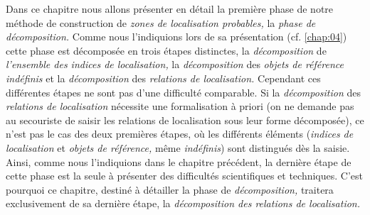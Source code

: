 Dans ce chapitre nous allons présenter en détail la première phase de
notre méthode de construction de \emph{zones de localisation
  probables,} la \emph{phase de décomposition.} Comme nous
l'indiquions lors de sa présentation (cf. \autoref{chap:04}) cette
phase est décomposée en trois étapes distinctes, la
\emph{décomposition} de \emph{l'ensemble des indices de localisation,}
la \emph{décomposition} des \emph{objets de référence indéfinis} et la
\emph{décomposition} des \emph{relations de localisation.} Cependant
ces différentes étapes ne sont pas d'une difficulté comparable. Si la
\emph{décomposition} des \emph{relations de localisation} nécessite
une formalisation à priori (on ne demande pas au secouriste de saisir
les relations de localisation sous leur forme décomposée), ce n'est
pas le cas des deux premières étapes, où les différents éléments
(\emph{indices de localisation} et \emph{objets de référence,} même
\emph{indéfinis}) sont distingués dès la saisie. Ainsi, comme nous
l'indiquions dans le chapitre précédent, la dernière étape de cette
phase est la seule à présenter des difficultés scientifiques et
techniques. C'est pourquoi ce chapitre, destiné à détailler la phase
de \emph{décomposition,} traitera exclusivement de sa dernière étape,
la \emph{décomposition des relations de localisation.}


